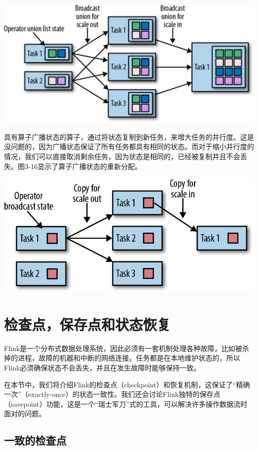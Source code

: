 \documentclass[cn,11pt,chinese]{elegantbook}
\begin{document}
\includegraphics{images/spaf_0315.png}

具有算子广播状态的算子，通过将状态复制到新任务，来增大任务的并行度。这是没问题的，因为广播状态保证了所有任务都具有相同的状态。而对于缩小并行度的情况，我们可以直接取消剩余任务，因为状态是相同的，已经被复制并且不会丢失。图3-16显示了算子广播状态的重新分配。

\includegraphics{images/spaf_0316.png}

\hypertarget{ux68c0ux67e5ux70b9ux4fddux5b58ux70b9ux548cux72b6ux6001ux6062ux590d}{%
\section{检查点，保存点和状态恢复}\label{ux68c0ux67e5ux70b9ux4fddux5b58ux70b9ux548cux72b6ux6001ux6062ux590d}}

Flink是一个分布式数据处理系统，因此必须有一套机制处理各种故障，比如被杀掉的进程，故障的机器和中断的网络连接。任务都是在本地维护状态的，所以Flink必须确保状态不会丢失，并且在发生故障时能够保持一致。

在本节中，我们将介绍Flink的检查点（checkpoint）和恢复机制，这保证了``精确一次''（exactly-once）的状态一致性。我们还会讨论Flink独特的保存点（savepoint）功能，这是一个``瑞士军刀''式的工具，可以解决许多操作数据流时面对的问题。

\hypertarget{ux4e00ux81f4ux7684ux68c0ux67e5ux70b9}{%
\subsection{一致的检查点}\label{ux4e00ux81f4ux7684ux68c0ux67e5ux70b9}}
\end{document}
